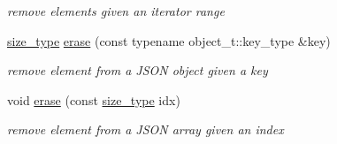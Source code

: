 \begin{DoxyCompactItemize}
\begin{DoxyCompactList}\small\item\em remove elements given an iterator range \end{DoxyCompactList}\item 
\hyperlink{classnlohmann_1_1basic__json_a1579a8f72a230358d6cd1a6e8a62859b}{size\-\_\-type} \hyperlink{classnlohmann_1_1basic__json_aa36e72ffc3241b960fe9186d19e03bc3}{erase} (const typename object\-\_\-t\-::key\-\_\-type \&key)
\begin{DoxyCompactList}\small\item\em remove element from a J\-S\-O\-N object given a key \end{DoxyCompactList}\item 
void \hyperlink{classnlohmann_1_1basic__json_a3da254c422ede5495f2815c5e48c00c5}{erase} (const \hyperlink{classnlohmann_1_1basic__json_a1579a8f72a230358d6cd1a6e8a62859b}{size\-\_\-type} idx)
\begin{DoxyCompactList}\small\item\em remove element from a J\-S\-O\-N array given an index \end{DoxyCompactList}\end{DoxyCompactItemize}
